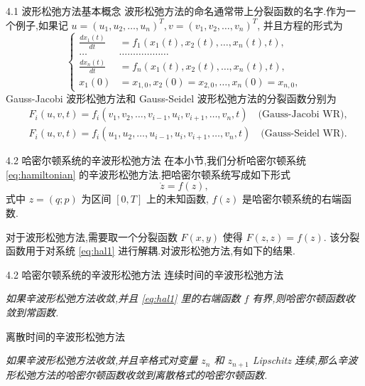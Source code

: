 \documentclass{beamer}
\begin{document}
\begin{frame}{4.1 波形松弛方法基本概念}
\qquad 波形松弛方法的命名通常带上分裂函数的名字.作为一个例子,如果记 $u=(u_{1},u_{2},\ldots,u_{n})^{T}, v=(v_{1},v_{2},\ldots,v_{n})^{T}$, 并且方程的形式为
\begin{equation*}
\left\{
\begin{aligned}
\frac{dx_{1}(t)}{dt}&=f_{1}(x_{1}(t),x_{2}(t),\ldots,x_{n}(t),t),\\
\ldots&\ldots\ldots\ldots\ldots\ldots\ldots\\
\frac{dx_{n}(t)}{dt}&=f_{n}(x_{1}(t),x_{2}(t),\ldots,x_{n}(t),t),\\
x_{1}(0)&=x_{1,0},x_{2}(0)=x_{2,0},\ldots,x_{n}(0)=x_{n,0},
\end{aligned}
\right.
\end{equation*}
Gauss-Jacobi 波形松弛方法和 Gauss-Seidel 波形松弛方法的分裂函数分别为
\begin{equation*}
\begin{aligned}
&F_{i}(u,v,t)=f_{i}(v_{1},v_{2},\ldots,v_{i-1},u_{i},v_{i+1},\ldots,v_{n},t)\quad \text{(Gauss-Jacobi~WR)},\\
&F_{i}(u,v,t)=f_{i}(u_{1},u_{2},\ldots,u_{i-1},u_{i},v_{i+1},\ldots,v_{n},t)\quad \text{(Gauss-Seidel~WR)}.
\end{aligned}
\end{equation*}
\end{frame}

\begin{frame}{4.2 哈密尔顿系统的辛波形松弛方法}
\qquad 在本小节,我们分析哈密尔顿系统 \eqref{eq:hamiltonian} 的辛波形松弛方法.把哈密尔顿系统写成如下形式
\begin{equation}\label{eq:hal1}
\dot{z}=f(z),
\end{equation}
式中 $z=(q;p)$ 为区间 $[0,T]$ 上的未知函数, $f(z)$ 是哈密尔顿系统的右端函数.

\qquad 对于波形松弛方法,需要取一个分裂函数 $F(x,y)$ 使得 $F(z,z)=f(z)$. 该分裂函数用于对系统 \eqref{eq:hal1} 进行解耦.对波形松弛方法,有如下的结果.
\end{frame}

\begin{frame}{4.2 哈密尔顿系统的辛波形松弛方法}
连续时间的辛波形松弛方法

\begin{theorem}
\emph{如果辛波形松弛方法收敛,并且 \eqref{eq:hal1} 里的右端函数 $f$ 有界,则哈密尔顿函数收敛到常函数.}
\end{theorem}

离散时间的辛波形松弛方法

\begin{theorem}
\emph{如果辛波形松弛方法收敛,并且辛格式对变量 $z_{n}$ 和 $z_{n+1}$ Lipschitz 连续,那么辛波形松弛方法的哈密尔顿函数收敛到离散格式的哈密尔顿函数.}
\end{theorem}
\end{frame}
\end{document}
